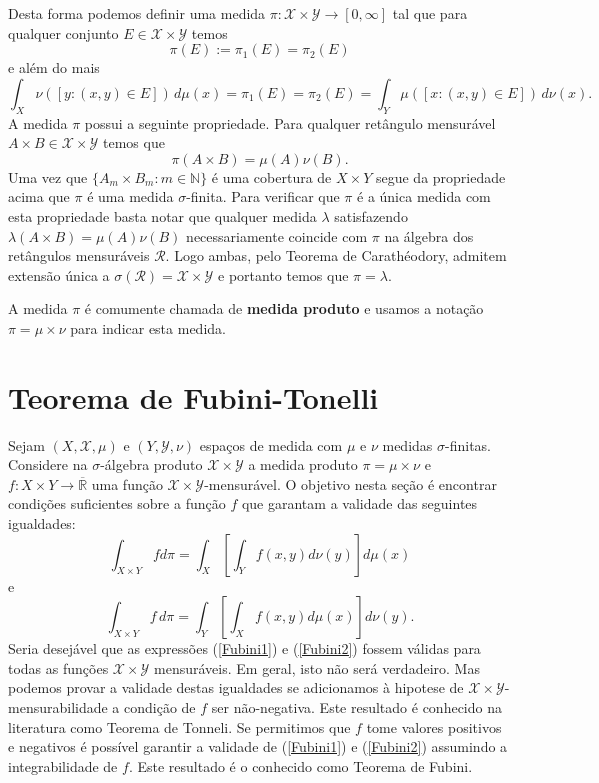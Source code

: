 Desta forma podemos definir uma medida 
$\pi:\mathscr{X}\times\mathscr{Y}\to [0,\infty]$ 
tal que para qualquer conjunto $E\in \mathscr{X}\times\mathscr{Y}$ 
temos 
\[
\pi(E) := \pi_1(E) = \pi_2(E)
\] 
e além do mais 
\[
	\int_{X} \nu([y:(x,y)\in E ])\, d\mu(x)
	=
	\pi_1(E)
	=
	\pi_2(E)
	=
	\int_{Y} \mu([x:(x,y)\in E ])\, d\nu(x).
\]
A medida $\pi$ possui a seguinte propriedade.
Para qualquer retângulo mensurável 
$A\times B\in \mathscr{X}\times\mathscr{Y}$ temos que 
\[
\pi(A\times B)=\mu(A)\nu(B).
\]
Uma vez que $\{A_m\times B_m: m\in \mathbb{N}\}$ é uma cobertura 
de $X\times Y$ segue da propriedade acima que 
$\pi$ é uma medida $\sigma$-finita. 
Para verificar que $\pi$ é a única medida com esta propriedade
basta notar que qualquer medida $\lambda$ satisfazendo 
$\lambda(A\times B)=\mu(A)\nu(B)$ necessariamente
coincide com $\pi$ na álgebra dos retângulos mensuráveis 
$\mathscr{R}$. Logo ambas, pelo Teorema de Carathéodory,
admitem extensão única a 
$\sigma(\mathscr{R})=\mathscr{X}\times\mathscr{Y}$ 
e portanto temos que $\pi=\lambda$.  

A medida $\pi$ é comumente chamada de \textbf{medida produto} e 
usamos a notação $\pi = \mu\times\nu$ para indicar esta medida.







\section{Teorema de Fubini-Tonelli}  
Sejam $(X, \mathscr{X}, \mu)$ e $(Y, \mathscr{Y}, \nu)$
espaços de medida com $\mu$ e $\nu$ medidas $\sigma$-finitas. 
Considere  na $\sigma$-álgebra
produto $\mathscr{X}\times \mathscr{Y}$ 
a medida produto $\pi = \mu\times \nu$ e 
$f:X\times Y\to \overline{\mathbb{R}}$ 
uma função $\mathscr{X}\times \mathscr{Y}$-mensurável. 
O objetivo nesta seção é encontrar condições suficientes  
sobre a função $f$ que garantam a validade
das seguintes igualdades:
\begin{equation}\label{Fubini1}
\int_{X\times Y}f d\pi
= 
\int_X\left[ \int_Y f(x,y) d\nu(y)\right] d\mu(x)
\end{equation}
e
\begin{equation}\label{Fubini2}
\int_{X\times Y}f\, d\pi
=
\int_Y\left[\int_Xf(x,y) d\mu(x)\right] d\nu(y).
\end{equation}
Seria desejável que as expressões (\ref{Fubini1}) e (\ref{Fubini2}) 
fossem válidas para todas as funções $\mathscr{X}\times\mathscr{Y}$
mensuráveis. Em geral, isto não será verdadeiro. Mas 
podemos provar a validade destas igualdades se adicionamos
à hipotese de $\mathscr{X}\times \mathscr{Y}$-mensurabilidade a 
condição de $f$ ser não-negativa. 
Este resultado é conhecido na literatura como Teorema de Tonneli. 
Se permitimos que $f$ tome valores positivos e negativos é possível  
garantir a validade de (\ref{Fubini1}) e (\ref{Fubini2}) 
assumindo a integrabilidade de $f$. Este resultado é o conhecido 
como Teorema de Fubini.




